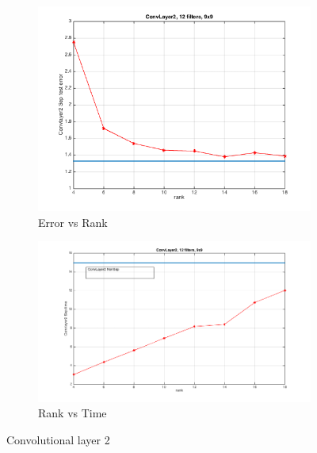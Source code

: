 \begin{figure}[h]
  \centering
  \begin{subfigure}[b]{0.40\textwidth}
   \includegraphics[width=\textwidth]{presentation_plots/convL2_error.png}
    \caption{Error vs Rank}
  \end{subfigure}
  \begin{subfigure}[b]{0.40\textwidth}
    \includegraphics[width=\textwidth]{presentation_plots/convL2_time.png}
    \caption{Rank vs Time}
  \end{subfigure}
  \caption{Convolutional layer 2}
  \label{fig:cnn2error}
\end{figure}
